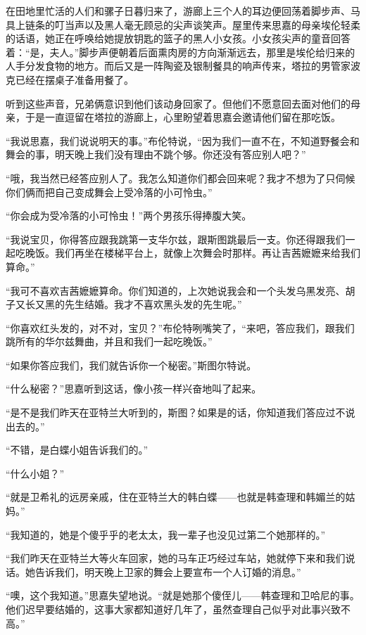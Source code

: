 \par 在田地里忙活的人们和骡子日暮归来了，游廊上三个人的耳边便回荡着脚步声、马具上链条的叮当声以及黑人毫无顾忌的尖声谈笑声。屋里传来思嘉的母亲埃伦轻柔的话语，她正在呼唤给她提放钥匙的篮子的黑人小女孩。小女孩尖声的童音回答着：“是，夫人。”脚步声便朝着后面熏肉房的方向渐渐远去，那里是埃伦给归来的人手分发食物的地方。而后又是一阵陶瓷及银制餐具的响声传来，塔拉的男管家波克已经在摆桌子准备用餐了。
\par 听到这些声音，兄弟俩意识到他们该动身回家了。但他们不愿意回去面对他们的母亲，于是一直逗留在塔拉的游廊上，心里盼望着思嘉会邀请他们留在那吃饭。
\par “我说思嘉，我们说说明天的事。”布伦特说，“因为我们一直不在，不知道野餐会和舞会的事，明天晚上我们没有理由不跳个够。你还没有答应别人吧？”
\par “哦，我当然已经答应别人了。我怎么知道你们都会回来呢？我才不想为了只伺候你们俩而把自己变成舞会上受冷落的小可怜虫。”
\par “你会成为受冷落的小可怜虫！”两个男孩乐得捧腹大笑。
\par “我说宝贝，你得答应跟我跳第一支华尔兹，跟斯图跳最后一支。你还得跟我们一起吃晚饭。我们再坐在楼梯平台上，就像上次舞会时那样。再让吉茜嬷嬷来给我们算命。”
\par “我可不喜欢吉茜嬷嬷算命。你们知道的，上次她说我会和一个头发乌黑发亮、胡子又长又黑的先生结婚。我才不喜欢黑头发的先生呢。”
\par “你喜欢红头发的，对不对，宝贝？”布伦特咧嘴笑了，“来吧，答应我们，跟我们跳所有的华尔兹舞曲，并且和我们一起吃晚饭。”
\par “如果你答应我们，我们就告诉你一个秘密。”斯图尔特说。
\par “什么秘密？”思嘉听到这话，像小孩一样兴奋地叫了起来。
\par “是不是我们昨天在亚特兰大听到的，斯图？如果是的话，你知道我们答应过不说出去的。”
\par “不错，是白蝶小姐告诉我们的。”
\par “什么小姐？”
\par “就是卫希礼的远房亲戚，住在亚特兰大的韩白蝶——也就是韩查理和韩媚兰的姑妈。”
\par “我知道的，她是个傻乎乎的老太太，我一辈子也没见过第二个她那样的。”
\par “我们昨天在亚特兰大等火车回家，她的马车正巧经过车站，她就停下来和我们说话。她告诉我们，明天晚上卫家的舞会上要宣布一个人订婚的消息。”
\par “噢，这个我知道。”思嘉失望地说。“就是她那个傻侄儿——韩查理和卫哈尼的事。他们迟早要结婚的，这事大家都知道好几年了，虽然查理自己似乎对此事兴致不高。”
